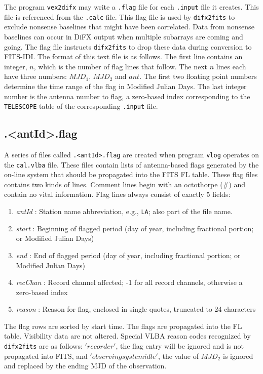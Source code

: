 The program {\tt vex2difx} may write a {\tt .flag} file for each {\tt .input} file it creates.
This file is referenced from the {\tt .calc} file.
This flag file is used by {\tt difx2fits} to exclude nonsense baselines that might have been correlated.
Data from nonsense baselines can occur in DiFX output when multiple subarrays are coming and going.
The flag file instructs {\tt difx2fits} to drop these data during conversion to FITS-IDI.
The format of this text file is as follows.
The first line contains an integer, $n$, which is the number of flag lines that follow.
The next $n$ lines each have three numbers: $MJD_1$, $MJD_2$ and $ant$.
The first two floating point numbers determine the time range of the flag in Modified Julian Days.
The last integer number is the antenna number to flag, a zero-based index corresponding to the {\tt TELESCOPE} table of the corresponding {\tt .input} file.



\subsection{.{\textless}antId{\textgreater}.flag} \label{sec:dotantflag}

A series of files called {\tt .{\textless}antId{\textgreater}.flag} are created when program {\tt vlog} operates on the {\tt cal.vlba} file.
These files contain lists of antenna-based flags generated by the on-line system that should be propagated into the FITS FL table.
These flag files contains two kinds of lines.
Comment lines begin with an octothorpe (\#) and contain no vital information.
Flag lines always consist of exactly 5 fields:
\begin{enumerate}
\item {\em antId} : Station name abbreviation, e.g., {\tt LA}; also part of the file name.
\item {\em start} : Beginning of flagged period (day of year, including fractional portion; or Modified Julian Days)
\item {\em end} : End of flagged period (day of year, including fractional portion; or Modified Julian Days)
\item {\em recChan} : Record channel affected; -1 for all record channels, otherwise a zero-based index
\item {\em reason} : Reason for flag, enclosed in single quotes, truncated to 24 characters
\end{enumerate}
The flag rows are sorted by start time. The flags are propagated into the FL table. Visibility data are not altered.
Special VLBA reason codes recognized by {\tt difx2fits} are as follows: $'recorder'$, the flag entry will be ignored and is not propagated into FITS, and $'observing system idle'$, the value of $MJD_2$ is ignored and replaced by the ending MJD of the observation.



